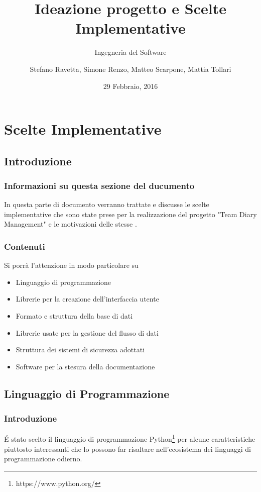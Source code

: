 \documentclass[12pt]{scrartcl}
\title{Ideazione progetto e Scelte Implementative}
\subtitle{Ingegneria del Software}
\author{Stefano Ravetta, Simone Renzo, Matteo Scarpone, Mattia Tollari}
\date{29 Febbraio, 2016}
\begin{document}
\maketitle
\tableofcontents
\section{Scelte Implementative}
\subsection{Introduzione}	%

\subsubsection{Informazioni su questa sezione del ducumento}
In questa parte di documento verranno trattate e discusse le scelte
implementative che sono state prese per la realizzazione del progetto "Team Diary Management"
e le motivazioni delle stesse .

\subsubsection{Contenuti}
Si porr\`a l'attenzione in modo particolare su
\begin{itemize}
    \item Linguaggio di programmazione
    \item Librerie per la creazione dell'interfaccia utente
    \item Formato e struttura della base di dati
    \item Librerie usate per la gestione del flusso di dati
    \item Struttura dei sistemi di sicurezza adottati
    \item Software per la stesura della documentazione
\end{itemize}

\subsection{Linguaggio di Programmazione}
\subsubsection{Introduzione}
\'E stato scelto il linguaggio di programmazione Python\footnote{https://www.python.org/} per alcune caratteristiche
piuttosto interessanti che lo possono far risaltare nell'ecosistema dei linguaggi di programmazione odierno.
\end{document}
